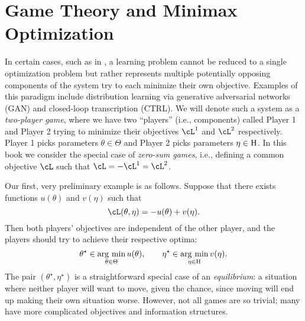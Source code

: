 \documentclass[../../book-main.tex]{subfiles}
\begin{document}
\section{Game Theory and Minimax Optimization} \label{sec:minimax}\label{sec:game_theory}

In certain cases, such as in , a learning problem cannot be reduced to a single optimization problem but rather represents multiple potentially opposing components of the system try to each minimize their own objective. Examples of this paradigm include distribution learning via generative adversarial networks (GAN) and closed-loop transcription (CTRL). We will denote such a system as a \textit{two-player game}, where we have two ``players'' (i.e., components) called Player 1 and Player 2 trying to minimize their objectives \(\cL^{1}\) and \(\cL^{2}\) respectively. Player 1 picks parameters \(\theta \in \Theta\) and Player 2 picks parameters \(\eta \in \mathrm{H}\). In this book we consider the special case of \textit{zero-sum games}, i.e., defining a common objective \(\cL\) such that \(\cL = -\cL^{1} = \cL^{2}\).

Our first, very preliminary example is as follows. Suppose that there exists functions \(u(\theta)\) and \(v(\eta)\) such that 
\begin{equation}
    \cL(\theta, \eta) = -u(\theta) + v(\eta).
\end{equation}
Then both players' objectives are independent of the other player, and the players should try to achieve their respective optima:
\begin{equation}
    \theta^{\star} \in \operatorname*{arg\ min}_{\theta \in \Theta}u(\theta), \qquad \eta^{\star} \in \operatorname*{arg\ min}_{\eta \in \mathrm{H}}v(\eta).
\end{equation}
The pair \((\theta^{\star}, \eta^{\star})\) is a straightforward special case of an \textit{equilibrium}: a situation where neither player will want to move, given the chance, since moving will end up making their own situation worse. However, not all games are so trivial; many have more complicated objectives and information structures.
\end{document}

